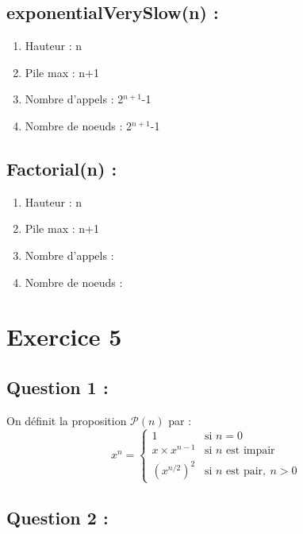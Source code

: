 \documentclass{article}
\begin{document}
\subsection*{exponentialVerySlow(n) :}
\begin{enumerate}
    \item Hauteur : n
    \item Pile max : n+1 
    \item Nombre d'appels : 2$^{n+1}$-1 
    \item Nombre de noeuds : 2$^{n+1}$-1
\end{enumerate}

\subsection*{Factorial(n) :}
\begin{enumerate}
    \item Hauteur : n
    \item Pile max : n+1
    \item Nombre d'appels : 
    \item Nombre de noeuds :  
\end{enumerate}

\section*{Exercice 5}

\subsection*{Question 1 :}

On définit la proposition $\mathcal{P}(n)$ par :
$$
x^n =
\begin{cases}
1 & \text{si } n = 0 \\
x \times x^{n-1} & \text{si } n \text{ est impair} \\
\left(x^{n/2}\right)^2 & \text{si } n \text{ est pair}, \ n > 0
\end{cases}
$$

\subsection*{Question 2 :}
\end{document}
